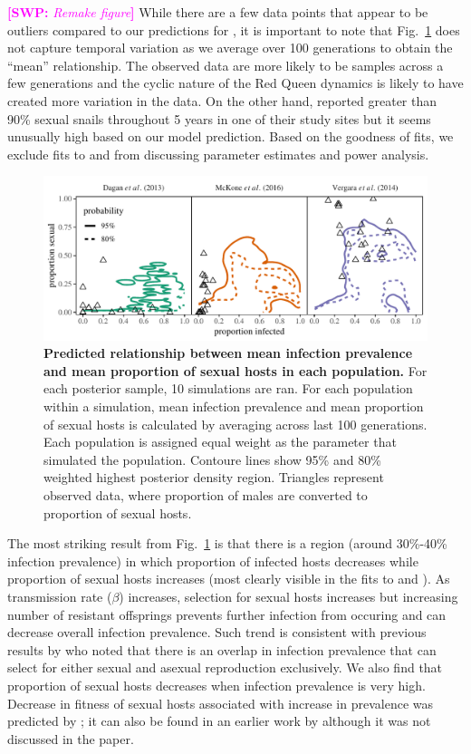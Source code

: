 \documentclass{article}\usepackage[]{graphicx}\usepackage[]{color}
\newcommand{\comment}[3]{\textcolor{#1}{\textbf{[#2: }\textit{#3}\textbf{]}}}
\newcommand{\swp}[1]{\comment{magenta}{SWP}{#1}}
\newcommand{\fref}[1]{Fig.~\ref{fig:#1}}
\begin{document}
\swp{Remake figure}
While there are a few data points that appear to be outliers compared to our predictions for \cite{vergara2014infection},
it is important to note that \fref{ivs} does not capture temporal variation as we average over 100 generations to obtain the ``mean'' relationship.
The observed data are more likely to be samples across a few generations and the cyclic nature of the Red Queen dynamics is likely to have created more variation in the data.
On the other hand, \cite{vergara2014infection} reported greater than 90\% sexual snails throughout 5 years in one of their study sites but it seems unusually high based on our model prediction.
Based on the goodness of fits, we exclude fits to \cite{dagan2013clonal} and \cite{mckone2016fine} from discussing parameter estimates and power analysis.

\begin{figure}[!ht]
\includegraphics[width=\textwidth]{../fig/simulated_data.pdf}
\caption{{\bf Predicted relationship between mean infection prevalence and mean proportion of sexual hosts in each population.}
For each posterior sample, 10 simulations are ran.
For each population within a simulation, mean infection prevalence and mean proportion of sexual hosts is calculated by averaging across last 100 generations. 
Each population is assigned equal weight as the parameter that simulated the population.
Contoure lines show 95\% and 80\% weighted highest posterior density region.
Triangles represent observed data, where proportion of males are converted to proportion of sexual hosts.
}
\label{fig:ivs}
\end{figure}

The most striking result from \fref{ivs} is that there is a region (around 30\%-40\% infection prevalence) in which proportion of infected hosts decreases while proportion of sexual hosts increases (most clearly visible in the fits to \cite{mckone2016fine} and \cite{vergara2014infection}).
As transmission rate ($\beta$) increases, selection for sexual hosts increases but increasing number of resistant offsprings prevents further infection from occuring and can decrease overall infection prevalence.
Such trend is consistent with previous results by \cite{lively2001trematode} who noted that there is an overlap in infection prevalence that can select for either sexual and asexual reproduction exclusively.
We also find that proportion of sexual hosts decreases when infection prevalence is very high.
Decrease in fitness of sexual hosts associated with increase in prevalence was predicted by \cite{ashby2015diversity}; 
it can also be found in an earlier work by \cite{lively2010epidemiological} although it was not discussed in the paper.
\end{document}
